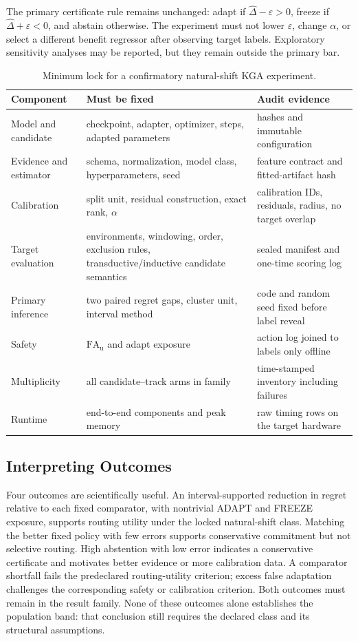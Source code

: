 The primary certificate rule remains unchanged: adapt if
$\widehat\Delta-\varepsilon>0$, freeze if
$\widehat\Delta+\varepsilon<0$, and abstain otherwise. The experiment must not lower
$\varepsilon$, change $\alpha$, or select a different benefit regressor after observing target
labels. Exploratory sensitivity analyses may be reported, but they remain outside the primary bar.

\begin{table}[!t]
\centering
\scriptsize
\caption{Minimum lock for a confirmatory natural-shift KGA experiment.}
\label{tab:compact-confirm-lock}
\begin{tabular}{@{}p{}p{}p{}@{}}
\toprule
Component & Must be fixed & Audit evidence \\
\midrule
Model and candidate & checkpoint, adapter, optimizer, steps, adapted parameters & hashes and immutable configuration \\
Evidence and estimator & schema, normalization, model class, hyperparameters, seed & feature contract and fitted-artifact hash \\
Calibration & split unit, residual construction, exact rank, $\alpha$ & calibration IDs, residuals, radius, no target overlap \\
Target evaluation & environments, windowing, order, exclusion rules, transductive/inductive candidate semantics & sealed manifest and one-time scoring log \\
Primary inference & two paired regret gaps, cluster unit, interval method & code and random seed fixed before label reveal \\
Safety & $\mathrm{FA}_{\mathrm u}$ and adapt exposure & action log joined to labels only offline \\
Multiplicity & all candidate--track arms in family & time-stamped inventory including failures \\
Runtime & end-to-end components and peak memory & raw timing rows on the target hardware \\
\bottomrule
\end{tabular}
\end{table}

\subsection{Interpreting Outcomes}

Four outcomes are scientifically useful. An interval-supported reduction in regret relative to each
fixed comparator, with nontrivial ADAPT and FREEZE exposure, supports routing utility under the
locked natural-shift class. Matching the better fixed policy with few errors supports conservative
commitment but not selective routing. High abstention with low error indicates a conservative
certificate and motivates better evidence or more calibration data. A comparator shortfall fails
the predeclared routing-utility criterion; excess false adaptation challenges the corresponding
safety or calibration criterion. Both outcomes must remain in the result family. None of these
outcomes alone establishes the
population band: that conclusion still requires the declared class and its structural assumptions.

